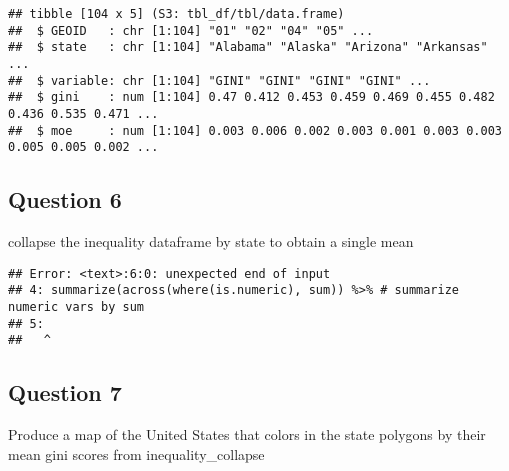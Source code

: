 \documentclass[
]{article}
\newenvironment{Shaded}{\begin{snugshade}}{\end{snugshade}}
\newcommand{\CommentTok}[1]{\textcolor[rgb]{0.56,0.35,0.01}{\textit{#1}}}
\newcommand{\KeywordTok}[1]{\textcolor[rgb]{0.13,0.29,0.53}{\textbf{#1}}}
\newcommand{\NormalTok}[1]{#1}
\newcommand{\OperatorTok}[1]{\textcolor[rgb]{0.81,0.36,0.00}{\textbf{#1}}}
\newcommand{\StringTok}[1]{\textcolor[rgb]{0.31,0.60,0.02}{#1}}
\begin{document}
\begin{verbatim}
## tibble [104 x 5] (S3: tbl_df/tbl/data.frame)
##  $ GEOID   : chr [1:104] "01" "02" "04" "05" ...
##  $ state   : chr [1:104] "Alabama" "Alaska" "Arizona" "Arkansas" ...
##  $ variable: chr [1:104] "GINI" "GINI" "GINI" "GINI" ...
##  $ gini    : num [1:104] 0.47 0.412 0.453 0.459 0.469 0.455 0.482 0.436 0.535 0.471 ...
##  $ moe     : num [1:104] 0.003 0.006 0.002 0.003 0.001 0.003 0.003 0.005 0.005 0.002 ...
\end{verbatim}

\hypertarget{question-6}{%
\subsection{Question 6}\label{question-6}}

collapse the inequality dataframe by state to obtain a single mean

\begin{Shaded}
\end{Shaded}

\begin{verbatim}
## Error: <text>:6:0: unexpected end of input
## 4: summarize(across(where(is.numeric), sum)) %>% # summarize numeric vars by sum
## 5: 
##   ^
\end{verbatim}

\hypertarget{question-7}{%
\subsection{Question 7}\label{question-7}}

Produce a map of the United States that colors in the state polygons by
their mean gini scores from inequality\_collapse
\end{document}
